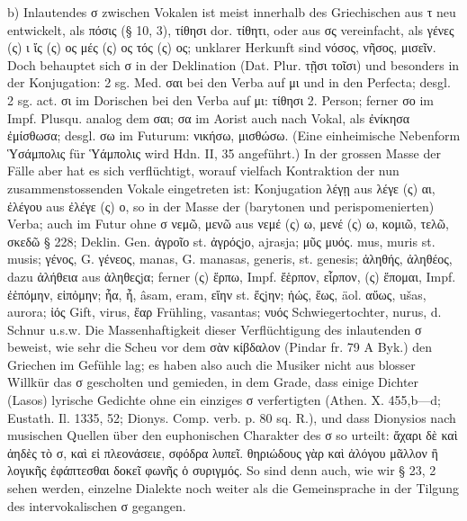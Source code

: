 b) Inlautendes σ zwischen Vokalen ist meist innerhalb des Griechischen aus τ neu
entwickelt, als πόσις (§ 10, 3), τίθησι dor. τίθητι, oder aus σς vereinfacht,
als γένες (ς) ι ἴς (ς) ος μές (ς) ος τός (ς) ος; unklarer Herkunft sind νόσος,
νῆσος, μισεῖν. Doch behauptet sich σ in der Deklination (Dat. Plur. τῇσι τοῖσι)
und besonders in der Konjugation: 2 sg. Med. σαι bei den Verba auf μι und in den
Perfecta; desgl. 2 sg. act. σι im Dorischen bei den Verba auf μι: τίθησι 2.
Person; ferner σο im Impf. Plusqu. analog dem σαι; σα im Aorist auch nach Vokal,
als ἐνίκησα ἐμίσθωσα; desgl. σω im Futurum: νικήσω, μισθώσω. (Eine einheimische
Nebenform Ὑσάμπολις für Ὑάμπολις wird Hdn. II, 35 angeführt.) In der grossen
Masse der Fälle aber hat es sich verflüchtigt, worauf vielfach Kontraktion der
nun zusammenstossenden Vokale eingetreten ist: Konjugation λέγῃ aus λέγε (ς) αι,
ἐλέγου aus ἐλέγε (ς) ο, so in der Masse der (barytonen und perispomenierten)
Verba; auch im Futur ohne σ νεμῶ, μενῶ aus νεμέ (ς) ω, μενέ (ς) ω, κομιῶ, τελῶ,
σκεδῶ § 228; Deklin. Gen. ἀγροῖο st. ἀγρόςjο,  ajrasja; μῦς μυός.  mus,
muris st. musis; γένος, G. γένεος,  manas, G. manasas,  generis, st.
genesis; ἀληθής, ἀληθέος, dazu ἀλήθεια aus ἀληθεςjα; ferner (ς) ἕρπω, Impf.
ἔἑρπον, εἷρπον, (ς) ἕπομαι, Impf. ἐἑπόμην, εἱπὀμην; ἦα, ἦ,  âsam,  eram,
εἴην st. ἔςjην; ἠώς, ἕως, äol. αὔως,  ušas,  aurora; ἰός Gift,  virus,
ἔαρ Frühling,  vasantas; νυός Schwiegertochter,  nurus, d. Schnur u.s.w.
Die Massenhaftigkeit dieser Verflüchtigung des inlautenden σ beweist, wie sehr
die Scheu vor dem σὰν κίβδαλον (Pindar fr. 79 A Byk.) den Griechen im Gefühle
lag; es haben also auch die Musiker nicht aus blosser Willkür das σ gescholten
und gemieden, in dem Grade, dass einige Dichter (Lasos) lyrische Gedichte ohne
ein einziges σ verfertigten (Athen. X. 455,b—d; Eustath. Il. 1335, 52; Dionys.
Comp. verb. p. 80 sq. R.), und dass Dionysios nach musischen Quellen über den
euphonischen Charakter des σ so urteilt: ἄχαρι δὲ καὶ ἀηδὲς τὸ σ, καὶ εἰ
πλεονάσειε, σφόδρα λυπεῖ. θηριώδους γὰρ καὶ ἀλόγου μᾶλλον ἢ λογικῆς ἐφάπτεσθαι
δοκεῖ φωνῆς ὁ συριγμός. So sind denn auch, wie wir § 23, 2 sehen werden,
einzelne Dialekte noch weiter als die Gemeinsprache in der Tilgung des
intervokalischen σ gegangen. 

